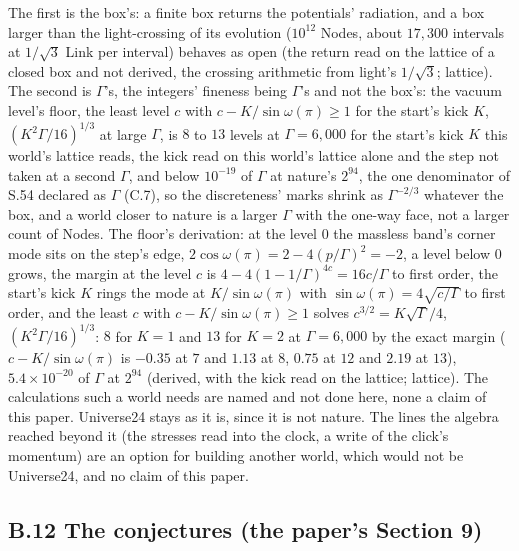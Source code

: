 \documentclass[pdflatex,sn-mathphys-num]{sn-jnl}
\theoremstyle{thmstyleone}
\begin{document}
The first is the box's: a finite box returns the potentials' radiation, and a box larger than the light-crossing of its evolution ($10^{12}$ Nodes, about $17{,}300$ intervals at $1 / \sqrt 3$ Link per interval) behaves as open (the return read on the lattice of a closed box and not derived, the crossing arithmetic from light's $1 / \sqrt 3$; lattice). The second is $\Gamma$'s, the integers' fineness being $\Gamma$'s and not the box's: the vacuum level's floor, the least level $c$ with $c - K / \sin\omega(\pi) \ge 1$ for the start's kick $K$, $(K^2\Gamma / 16)^{1 / 3}$ at large $\Gamma$, is $8$ to $13$ levels at $\Gamma = 6{,}000$ for the start's kick $K$ this world's lattice reads, the kick read on this world's lattice alone and the step not taken at a second $\Gamma$, and below $10^{-19}$ of $\Gamma$ at nature's $2^{94}$, the one denominator of S.54 declared as $\Gamma$ (C.7), so the discreteness' marks shrink as $\Gamma^{-2 / 3}$ whatever the box, and a world closer to nature is a larger $\Gamma$ with the one-way face, not a larger count of Nodes. The floor's derivation: at the level $0$ the massless band's corner mode sits on the step's edge, $2\cos\omega(\pi) = 2 - 4(p / \Gamma)^2 = -2$, a level below $0$ grows, the margin at the level $c$ is $4 - 4(1 - 1 / \Gamma)^{4c} = 16c / \Gamma$ to first order, the start's kick $K$ rings the mode at $K / \sin\omega(\pi)$ with $\sin\omega(\pi) = 4\sqrt{c / \Gamma}$ to first order, and the least $c$ with $c - K / \sin\omega(\pi) \ge 1$ solves $c^{3 / 2} = K\sqrt\Gamma / 4$, $(K^2\Gamma / 16)^{1 / 3}$: $8$ for $K = 1$ and $13$ for $K = 2$ at $\Gamma = 6{,}000$ by the exact margin ($c - K / \sin\omega(\pi)$ is $-0.35$ at $7$ and $1.13$ at $8$, $0.75$ at $12$ and $2.19$ at $13$), $5.4 \times 10^{-20}$ of $\Gamma$ at $2^{94}$ (derived, with the kick read on the lattice; lattice). The calculations such a world needs are named and not done here, none a claim of this paper. Universe24 stays as it is, since it is not nature. The lines the algebra reached beyond it (the stresses read into the clock, a write of the click's momentum) are an option for building another world, which would not be Universe24, and no claim of this paper.
\subsection*{B.12 The conjectures (the paper's Section 9)}
\end{document}
